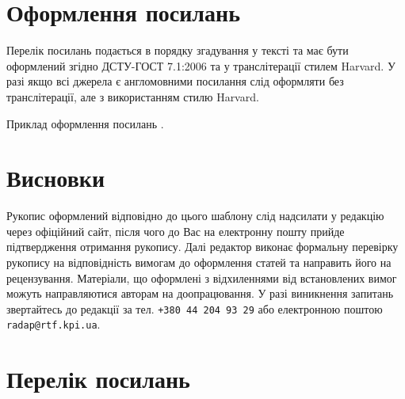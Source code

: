 \begin{multicols}{2}
\section{Оформлення посилань}

Перелік посилань подається в порядку згадування у тексті та має бути оформлений згідно ДСТУ-ГОСТ 7.1:2006 та у транслітерації стилем Harvard. У разі якщо всі джерела є англомовними посилання слід оформляти без транслітерації, але з використанням стилю Harvard.

Приклад оформлення посилань \cite{radap1354ref1,radap1354ref4}. 



\section*{Висновки}
Рукопис оформлений відповідно до цього шаблону слід надсилати у редакцію через офіційний сайт, після чого до Вас на електронну пошту прийде підтвердження отримання рукопису. Далі редактор виконає формальну перевірку рукопису на відповідність вимогам до оформлення статей та направить його на рецензування. Матеріали, що оформлені з відхиленнями від встановлених вимог можуть направляютися авторам на доопрацювання. У разі виникнення запитань звертайтесь до редакції за тел. \texttt{+380 44 204 93 29} або електронною поштою \texttt{radap@rtf.kpi.ua}.



\section*{Перелік посилань}
\begin{enumerate}\footnotesize
		

\end{enumerate}
\end{multicols}
